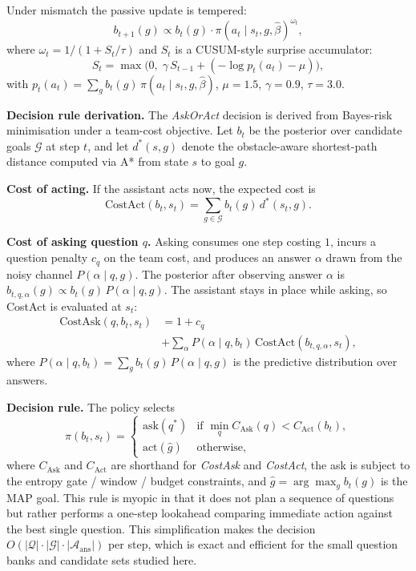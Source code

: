 \documentclass[10pt,twocolumn]{article}
\begin{document}
Under mismatch the passive update is tempered:
\[
  b_{t+1}(g) \propto b_t(g) \cdot \pi(a_t \mid s_t, g, \hat\beta)^{\omega_t},
\]
where $\omega_t = 1/(1 + S_t/\tau)$ and $S_t$ is a CUSUM-style surprise accumulator:
\[
  S_t = \max\bigl(0,\; \gamma\, S_{t-1} + (-\!\log p_t(a_t) - \mu)\bigr),
\]
with $p_t(a_t) = \sum_g b_t(g)\,\pi(a_t \mid s_t, g, \hat\beta)$, $\mu{=}1.5$, $\gamma{=}0.9$, $\tau{=}3.0$.

\textbf{Decision rule derivation.}
The \textit{AskOrAct} decision is derived from Bayes-risk minimisation under a team-cost objective.
Let $b_t$ be the posterior over candidate goals $\mathcal{G}$ at step $t$, and let $d^*(s, g)$ denote the obstacle-aware shortest-path distance computed via A* from state $s$ to goal $g$.

\textbf{Cost of acting.}
If the assistant acts now, the expected cost is
\[
  \text{CostAct}(b_t, s_t) = \sum_{g \in \mathcal{G}} b_t(g)\,d^*(s_t, g).
\]

\textbf{Cost of asking question $q$.}
Asking consumes one step costing $1$, incurs a question penalty $c_q$ on the team cost, and produces an answer $\alpha$ drawn from the noisy channel $P(\alpha \mid q, g)$.
The posterior after observing answer $\alpha$ is $b_{t,q,\alpha}(g) \propto b_t(g)\,P(\alpha \mid q, g)$. The assistant stays in place while asking, so CostAct is evaluated at $s_t$:
\begin{align*}
  \text{CostAsk}(q, b_t, s_t) &= 1 + c_q \\
    &+ \textstyle\sum_{\alpha} P(\alpha \mid q, b_t)\,\text{CostAct}(b_{t,q,\alpha}, s_t),
\end{align*}
where $P(\alpha \mid q, b_t) = \sum_g b_t(g)\,P(\alpha \mid q, g)$ is the predictive distribution over answers.

\textbf{Decision rule.}
The policy selects
\[
  \pi(b_t, s_t) = \begin{cases}
    \mathrm{ask}(q^*) & \text{if } \min_q C_{\mathrm{Ask}}(q) < C_{\mathrm{Act}}(b_t),\\
    \mathrm{act}(\hat{g}) & \text{otherwise,}
  \end{cases}
\]
where $C_{\mathrm{Ask}}$ and $C_{\mathrm{Act}}$ are shorthand for \textit{CostAsk} and \textit{CostAct}, the ask is subject to the entropy gate / window / budget constraints, and $\hat{g} = \arg\max_g b_t(g)$ is the MAP goal.
This rule is myopic in that it does not plan a sequence of questions but rather performs a one-step lookahead comparing immediate action against the best single question.
This simplification makes the decision $O(|\mathcal{Q}| \cdot |\mathcal{G}| \cdot |\mathcal{A}_{\text{ans}}|)$ per step, which is exact and efficient for the small question banks and candidate sets studied here.
\end{document}

